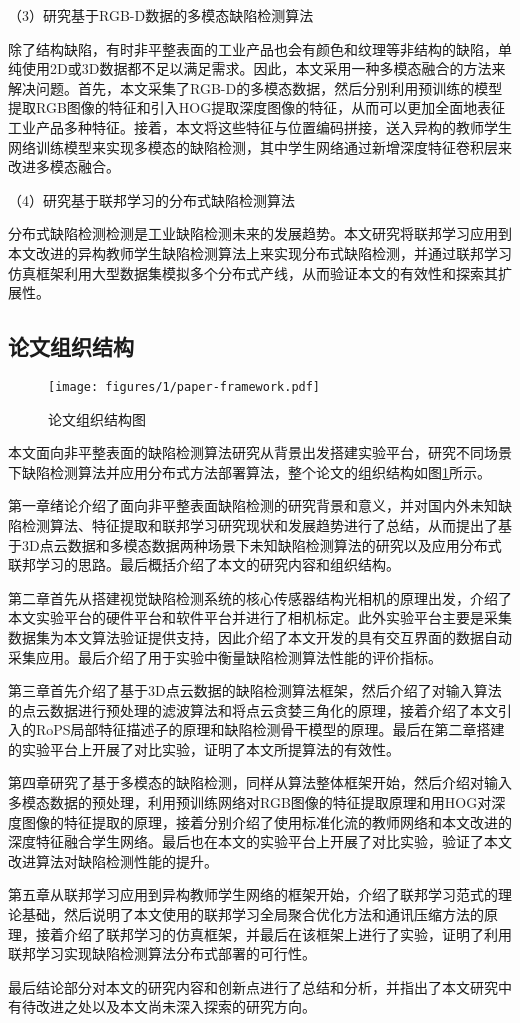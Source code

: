 （3）研究基于RGB-D数据的多模态缺陷检测算法

除了结构缺陷，有时非平整表面的工业产品也会有颜色和纹理等非结构的缺陷，单纯使用2D或3D数据都不足以满足需求。因此，本文采用一种多模态融合的方法来解决问题。首先，本文采集了RGB-D的多模态数据，然后分别利用预训练的模型提取RGB图像的特征和引入HOG提取深度图像的特征，从而可以更加全面地表征工业产品多种特征。接着，本文将这些特征与位置编码拼接，送入异构的教师学生网络训练模型来实现多模态的缺陷检测，其中学生网络通过新增深度特征卷积层来改进多模态融合。

（4）研究基于联邦学习的分布式缺陷检测算法

分布式缺陷检测检测是工业缺陷检测未来的发展趋势。本文研究将联邦学习应用到本文改进的异构教师学生缺陷检测算法上来实现分布式缺陷检测，并通过联邦学习仿真框架利用大型数据集模拟多个分布式产线，从而验证本文的有效性和探索其扩展性。

\subsection{论文组织结构}
\begin{figure}[htbp]
    \centering
    \texttt{[image: figures/1/paper-framework.pdf]}
    \caption{论文组织结构图}\label{fig:paper-framework}
  \end{figure}
本文面向非平整表面的缺陷检测算法研究从背景出发搭建实验平台，研究不同场景下缺陷检测算法并应用分布式方法部署算法，整个论文的组织结构如图\ref{fig:paper-framework}所示。

第一章绪论介绍了面向非平整表面缺陷检测的研究背景和意义，并对国内外未知缺陷检测算法、特征提取和联邦学习研究现状和发展趋势进行了总结，从而提出了基于3D点云数据和多模态数据两种场景下未知缺陷检测算法的研究以及应用分布式联邦学习的思路。最后概括介绍了本文的研究内容和组织结构。

第二章首先从搭建视觉缺陷检测系统的核心传感器结构光相机的原理出发，介绍了本文实验平台的硬件平台和软件平台并进行了相机标定。此外实验平台主要是采集数据集为本文算法验证提供支持，因此介绍了本文开发的具有交互界面的数据自动采集应用。最后介绍了用于实验中衡量缺陷检测算法性能的评价指标。

第三章首先介绍了基于3D点云数据的缺陷检测算法框架，然后介绍了对输入算法的点云数据进行预处理的滤波算法和将点云贪婪三角化的原理，接着介绍了本文引入的RoPS局部特征描述子的原理和缺陷检测骨干模型的原理。最后在第二章搭建的实验平台上开展了对比实验，证明了本文所提算法的有效性。

第四章研究了基于多模态的缺陷检测，同样从算法整体框架开始，然后介绍对输入多模态数据的预处理，利用预训练网络对RGB图像的特征提取原理和用HOG对深度图像的特征提取的原理，接着分别介绍了使用标准化流的教师网络和本文改进的深度特征融合学生网络。最后也在本文的实验平台上开展了对比实验，验证了本文改进算法对缺陷检测性能的提升。

第五章从联邦学习应用到异构教师学生网络的框架开始，介绍了联邦学习范式的理论基础，然后说明了本文使用的联邦学习全局聚合优化方法和通讯压缩方法的原理，接着介绍了联邦学习的仿真框架，并最后在该框架上进行了实验，证明了利用联邦学习实现缺陷检测算法分布式部署的可行性。

最后结论部分对本文的研究内容和创新点进行了总结和分析，并指出了本文研究中有待改进之处以及本文尚未深入探索的研究方向。